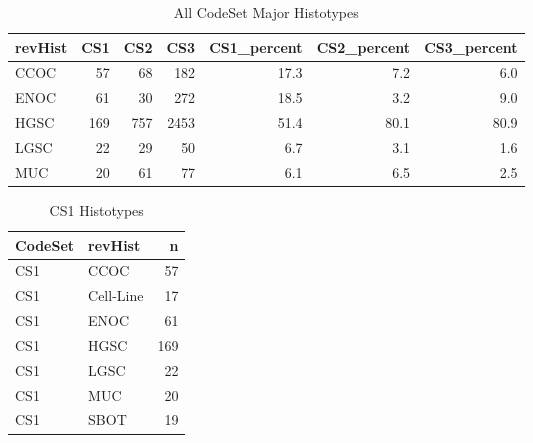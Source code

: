 \documentclass[
]{report}
\begin{document}
\begin{table}

\caption{\label{tab:dist-major-hist}All CodeSet Major Histotypes}
\centering
\begin{tabular}[t]{l|r|r|r|r|r|r}
\hline
revHist & CS1 & CS2 & CS3 & CS1\_percent & CS2\_percent & CS3\_percent\\
\hline
CCOC & 57 & 68 & 182 & 17.3 & 7.2 & 6.0\\
\hline
ENOC & 61 & 30 & 272 & 18.5 & 3.2 & 9.0\\
\hline
HGSC & 169 & 757 & 2453 & 51.4 & 80.1 & 80.9\\
\hline
LGSC & 22 & 29 & 50 & 6.7 & 3.1 & 1.6\\
\hline
MUC & 20 & 61 & 77 & 6.1 & 6.5 & 2.5\\
\hline
\end{tabular}
\end{table}

\begin{table}

\caption{\label{tab:dist-cs1}CS1 Histotypes}
\centering
\begin{tabular}[t]{l|l|r}
\hline
CodeSet & revHist & n\\
\hline
CS1 & CCOC & 57\\
\hline
CS1 & Cell-Line & 17\\
\hline
CS1 & ENOC & 61\\
\hline
CS1 & HGSC & 169\\
\hline
CS1 & LGSC & 22\\
\hline
CS1 & MUC & 20\\
\hline
CS1 & SBOT & 19\\
\hline
\end{tabular}
\end{table}
\end{document}
